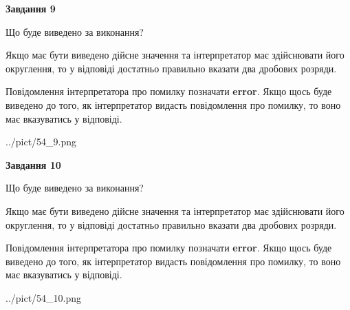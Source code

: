 \documentclass[12pt, ukrainian]{article}
\begin{document}
{\begin {Large}
{\begin {center}\textbf{Завдання 9}\end {center}}\par
Що буде виведено за виконання? \par

Якщо має бути виведено дійсне значення та інтерпретатор має здійснювати його округлення, 
то у відповіді достатньо правильно вказати два дробових розряди.

Повідомлення інтерпретатора про помилку позначати \textbf{error}.
Якщо щось буде виведено до того, як інтерпретатор видасть повідомлення про помилку, 
то воно має вказуватись у відповіді. \par

\begin{center}
	{../pict/54_9.png}
\end{center}
\newpage

{\begin {center}\textbf{Завдання 10}\end {center}}\par
Що буде виведено за виконання? \par

Якщо має бути виведено дійсне значення та інтерпретатор має здійснювати його округлення, 
то у відповіді достатньо правильно вказати два дробових розряди.

Повідомлення інтерпретатора про помилку позначати \textbf{error}.
Якщо щось буде виведено до того, як інтерпретатор видасть повідомлення про помилку, 
то воно має вказуватись у відповіді. \par

\begin{center}
	{../pict/54_10.png}
\end{center}
\newpage

\end {Large}}
\end{document}
